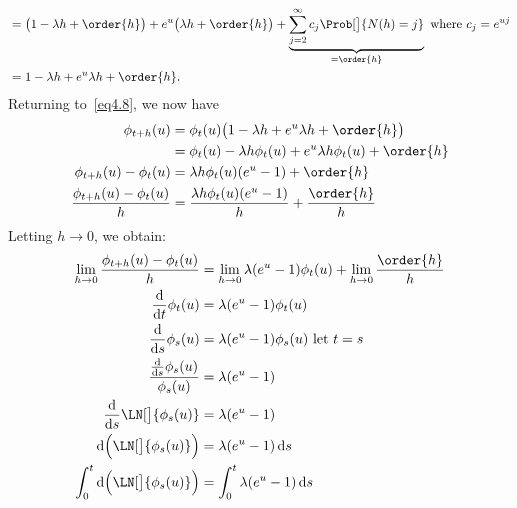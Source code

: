 \begin{Result}
\begin{align*}
         & =\bigl(1-\lambda h+\order{h}\bigr)+e^{u}
        \bigl(\lambda h+\order{h}\bigr)+\underbrace{\sum_{j=2}^{\infty}c_j\Prob[\big]{N(h)=j}}_{=\order{h}}\text{ where $c_j=e^{uj}$} \\
         & =1-\lambda h+e^{u}\lambda h+\order{h}.
    \end{align*}
    Returning to~\ref{eq4.8}, we now have
    \begin{align*}
        \phi_{t+h}(u)
                                          & =\phi_t(u)\bigl(1-\lambda h+e^{u}\lambda h+\order{h}\bigr)     \\
                                          & =\phi_t(u)-\lambda h\phi_t(u)+e^u \lambda h\phi_t(u)+\order{h} \\
        \phi_{t+h}(u)-\phi_t(u)           & =\lambda h \phi_t(u)(e^u-1)+\order{h}                          \\
        \frac{\phi_{t+h}(u)-\phi_t(u)}{h} & =\frac{\lambda h\phi_t(u)(e^u-1)}{h}+\frac{\order{h}}{h}
    \end{align*}
    Letting $ h\to 0 $, we obtain:
    \begin{align*}
        \lim\limits_{{h} \to {0}}\frac{\phi_{t+h}(u)-\phi_t(u)}{h} & =\lim\limits_{{h} \to {0}}\lambda (e^u-1)\phi_t(u)+\lim\limits_{{h} \to {0}}\frac{\order{h}}{h} \\
        \odv*{\phi_t(u)}{t}                                        & =\lambda(e^u-1)\phi_t(u)                                                                        \\
        \odv*{\phi_s(u)}{s}                                        & =\lambda(e^u-1)\phi_s(u)\text{ let $t=s$}                                                       \\
        \frac{\odv*{\phi_s(u)}{s} }{\phi_s(u)}                     & =\lambda(e^u-1)                                                                                 \\
        \odv*{\LN[\big]{\phi_s(u)}}{s}                             & =\lambda (e^u-1)                                                                                \\
        \odif{\Bigl(\LN[\big]{\phi_s(u)}\Bigr)}                    & =\lambda(e^{u}-1)\odif{s}                                                                       \\
        \int_{0}^{t}\odif{\Bigl(\LN[\big]{\phi_s(u)}\Bigr)}        & =\int_{0}^{t}\lambda (e^u-1)\odif{s}                                                            \\

\end{align*}
\end{Result}
